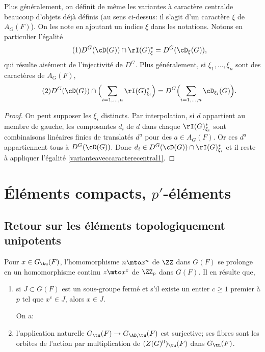 Plus généralement, on définit de même les variantes \og à caractère central\fg de beaucoup d'objets déjà définis (au sens ci-dessus: il s'agit d'un caractère $\xi$ de $A_{G}(F)$). On les note en ajoutant un indice $\xi$ dans les notations. Notons en particulier l'égalité%
\begin{equation}\tag{1}\label{varianteaveccaracterecentral1}
D^G(\cD(G))\cap \rI(G)^*_{\xi}=D^G(\cD_{\xi}(G)),
\end{equation}
qui résulte aisément de l'injectivité de $D^G$.
Plus généralement, si $\xi_{1},\dots,\xi_{n}$ sont des caractères de $A_{G}(F)$,
\begin{equation}\tag{2}\label{varianteaveccaracterecentral2}
D^G(\cD(G))\cap \Bigl(\sum_{i=1,\dots,n}\rI(G)^*_{\xi_{i}}\Bigr)=D^G\Bigl(\sum_{i=1,\dots,n}\cD_{\xi_{i}}(G)\Bigr).
\end{equation}

\begin{proof}
On peut supposer les $\xi_{i}$ distincts. Par interpolation, si $d$ appartient au membre de gauche, les composantes $d_{i}$ de $d$ dans chaque $\rI(G)^*_{\xi_{i}}$ sont combinaisons linéaires finies de translatés $d^{a}$ pour des $a\in A_{G}(F)$. Or ces $d^{a}$ appartiennent tous à $D^G(\cD(G))$. Donc $d_{i}\in D^G(\cD(G))\cap \rI(G)^*_{\xi_{i}}$ et il reste à appliquer l'égalité \eqref{varianteaveccaracterecentral1}.
\end{proof}

\section{Éléments compacts, \texorpdfstring{$p'$}{p'}-éléments}

\subsection{Retour sur les éléments topologiquement unipotents}\label{retour}
Pour $x\in G_{\tu}(F)$, l'homomorphisme $n\mto x^n$ de $\ZZ$ dans $G(F)$ se prolonge en un homomorphisme continu $z\mto x^z$ de $\ZZ_{p}$ dans $G(F)$. Il en résulte que,
\begin{enumerate}
\item\label{retour1}
si $J\subset G(F)$ est un sous-groupe fermé et s'il existe un entier $c\geq1$ premier à $p$ tel que $x^c\in J$, alors $x\in J$.

\noindent
On a:
\item\label{retour2}
l'application naturelle $G_{\tu}(F)\to G_{\AD,\tu}(F)$ est surjective; ses fibres sont les orbites de l'action par multiplication de $(Z(G)^0)_{\tu}(F)$ dans $G_{\tu}(F)$.
\end{enumerate}

